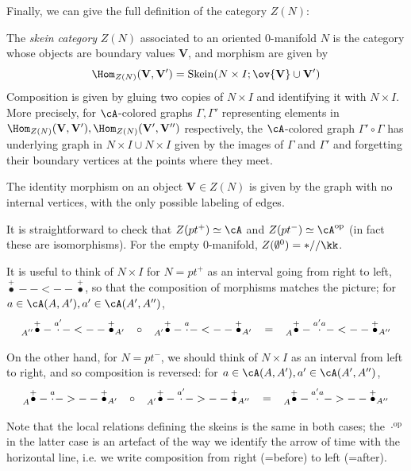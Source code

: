 \documentclass[12pt]{article}
\newcommand{\empt}[1]{{\emptyset^{#1}}}
\newcommand{\VV}{{\mathbf{V}}}
\DeclareMathOperator{\Skein}{Skein}
\newcommand{\op}{{\text{op}}}
\begin{document}
Finally, we can give the full definition of the category
$Z(N)$:

\begin{definition}
\label{d:skein-category}
The \emph{skein category} $Z(N)$ associated to an
oriented 0-manifold $N$
is the category whose objects are boundary values $\VV$,
and morphism are given by
\[
\Hom_{Z(N)}(\VV,\VV') = \Skein(N \times I; \ov{\VV} \cup \VV')
\]
Composition is given by gluing two copies of $N \times I$
and identifying it with $N \times I$.
More precisely, for $\cA$-colored graphs $\Gamma,\Gamma'$
representing elements in
$\Hom_{Z(N)}(\VV,\VV'), \Hom_{Z(N)}(\VV',\VV'')$
respectively,
the $\cA$-colored graph $\Gamma' \circ \Gamma$
has underlying graph in $N \times I \cup N \times I$
given by the images of $\Gamma$ and $\Gamma'$
and forgetting their boundary vertices
at the points where they meet.

The identity morphism on an object $\VV \in Z(N)$
is given by the graph with no internal vertices,
with the only possible labeling of edges.
\end{definition}

It is straightforward to check that
$Z(pt^+) \simeq \cA$ and $Z(pt^-) \simeq \cA^\op$
(in fact these are isomorphisms).
For the empty 0-manifold, $Z(\empt{0}) = *//\kk$.

It is useful to think of $N \times I$ for $N = pt^+$
as an interval going from right to left,
$\overset{+}{\bullet}--<--\overset{+}{\bullet}$,
so that the composition of morphisms matches the picture;
for $a \in \cA(A,A'), a' \in \cA(A',A'')$,
\[
\prescript{}{A''}{\overset{+}{\bullet}}-\overset{a'}{\cdot}-<--
\overset{+}{\bullet}_{A'}
\;\;\;
\circ
\;\;\;
\prescript{}{A'}{\overset{+}{\bullet}}-\overset{a}{\cdot}-<--
\overset{+}{\bullet}_{A'}
\;\;\;
=
\;\;\;
\prescript{}{A}{\overset{+}{\bullet}}-\overset{a'a}{\cdot}-<--
\overset{+}{\bullet}_{A''}
\]

On the other hand, for $N = pt^-$,
we should think of $N \times I$ as an interval from left to right,
and so composition is reversed:
for $a \in \cA(A,A'), a' \in \cA(A',A'')$,
\[
\prescript{}{A}{\overset{+}{\bullet}}-\overset{a}{\cdot}->--
\overset{+}{\bullet}_{A'}
\;\;\;
\circ
\;\;\;
\prescript{}{A'}{\overset{+}{\bullet}}-\overset{a'}{\cdot}->--
\overset{+}{\bullet}_{A''}
\;\;\;
=
\;\;\;
\prescript{}{A}{\overset{+}{\bullet}}-\overset{a'a}{\cdot}->--
\overset{+}{\bullet}_{A''}
\]


\begin{remark}
\label{r:arrow-of-time}
Note that the local relations defining the skeins is the same
in both cases; the $\cdot^\op$ in the latter case is an artefact of the
way we identify the arrow of time with the horizontal line,
i.e. we write composition from right (=before) to left (=after).
\end{remark}
\end{document}
